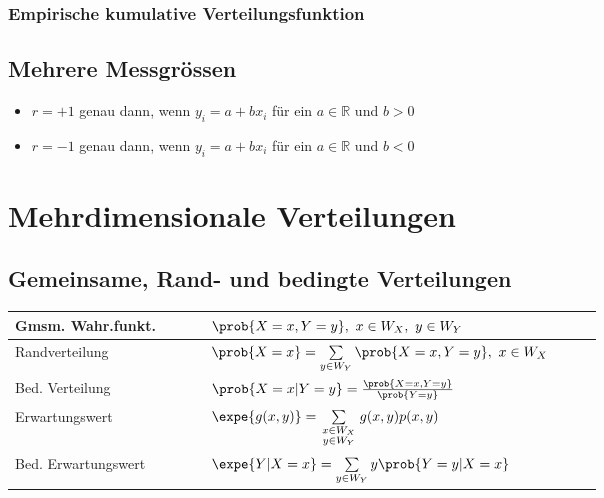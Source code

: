 \documentclass[8pt,a4paper]{scrartcl}
\begin{document}
\begin{multicols*}{3}
\subsubsection{Empirische kumulative Verteilungsfunktion}


\subsection{Mehrere Messgrössen}



\begin{itemize}
\item $r=+1$ genau dann, wenn $y_i=a+bx_i$ für ein $a\in\mathbb{R}$ und $b>0$
\item $r=-1$ genau dann, wenn $y_i=a+bx_i$ für ein $a\in\mathbb{R}$ und $b<0$
\end{itemize}


\vfill
\null
\columnbreak

\section{Mehrdimensionale Verteilungen}

\subsection{Gemeinsame, Rand- und bedingte Verteilungen}

\small
\begin{tabular}{p{0.3\linewidth}p{0.6\linewidth}}
Gmsm. Wahr.funkt.&$\prob{X=x,Y=y},\ x\in W_X,\ y\in W_Y$\\
\hline
Randverteilung&$\prob{X=x}=\sum\limits_{y\in W_Y}\prob{X=x,Y=y},\ x\in W_X$\\
\hline
Bed. Verteilung&$\prob{X=x|Y=y}=\frac{\prob{X=x,Y=y}}{\prob{Y=y}}$\\
\hline
Erwartungswert&$\expe{g(x,y)}=\sum\limits_{\begin{smallmatrix}x\in W_X\\y\in W_Y\end{smallmatrix}}g(x,y)p(x,y)$\\
\hline
Bed. Erwartungswert&$\expe{Y|X=x}=\sum\limits_{y\in W_Y}y\prob{Y=y|X=x}$
\end{tabular}


\end{multicols*}
\end{document}
